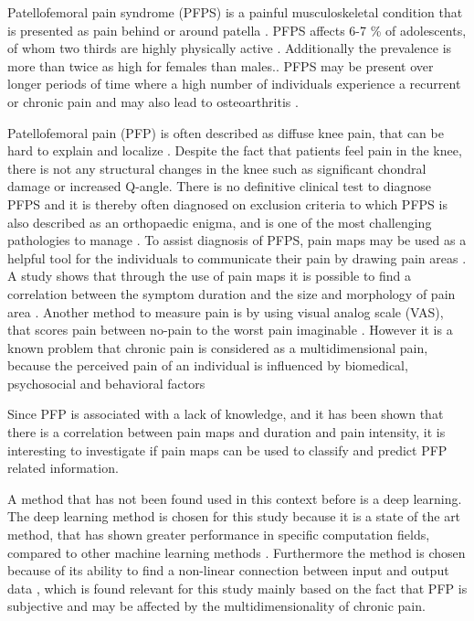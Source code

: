 Patellofemoral pain syndrome (PFPS) is a painful musculoskeletal condition that is presented as pain behind or around patella \citep{Maclachlan2017, Smith2015}. PFPS affects 6-7 \% of adolescents, of whom two thirds are highly physically active \citep{Rathleff2015}. Additionally the prevalence is more than twice as high for females than males.\citep{Petersen2013, Rathleff2015}.
PFPS may be present over longer periods of time where a high number of individuals experience a recurrent or chronic pain \citep{Witvrouw2014} and may also lead to osteoarthritis \citep{Petersen2013, Crossley2016}.

\noindent
Patellofemoral pain (PFP) is often described as diffuse knee pain, that can be hard to explain and localize \citep{Witvrouw2014}. Despite the fact that patients feel pain in the knee, there is not any structural changes in the knee such as significant chondral damage or increased Q-angle. There is no definitive clinical test to diagnose PFPS and it is thereby often diagnosed on exclusion criteria \citep{Petersen2013} to which PFPS is also described as an orthopaedic enigma, and is one of the most challenging pathologies to manage \citep{Dye2001}. 
To assist diagnosis of PFPS, pain maps may be used as a helpful tool for the individuals to communicate their pain by drawing pain areas \citep{Boudreau2016}. A study shows that through the use of pain maps it is possible to find a correlation between the symptom duration and the size and morphology of pain area \citep{Boudreau2017}. 
Another method to measure pain is by using visual analog scale (VAS), that scores pain between no-pain to the worst pain imaginable \citep{Haefeli2005}. However it is a known problem that chronic pain is considered as a multidimensional pain, because the perceived pain of an individual is influenced by biomedical, psychosocial and behavioral factors \citep{Dansie2013}

\noindent
Since PFP is associated with a lack of knowledge, and it has been shown that there is a correlation between pain maps and duration and pain intensity, it is interesting to investigate if pain maps can be used to classify and predict PFP related information. 

\noindent
A method that has not been found used in this context before is a deep learning. The deep learning method is chosen for this study because it is a state of the art method, that has shown greater performance in specific computation fields, compared to other machine learning methods \citep{LeCun2015}.
Furthermore the method is chosen because of its ability to find a non-linear connection between input and output data \citep{LeCun2015}, which is found relevant for this study mainly based on the fact that PFP is subjective and may be affected by the multidimensionality of chronic pain.  \\



